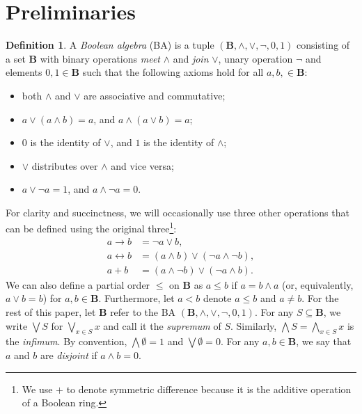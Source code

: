 \documentclass{article}
\theoremstyle{definition}
\newtheorem{definition}{Definition}
\theoremstyle{remark}
\begin{document}
\section{Preliminaries}


\begin{definition} \label{def:ba}
  A \emph{Boolean algebra} (BA) is a tuple $(\mathbf{B}, \land, \lor, \neg, 0,
  1)$ consisting of a set $\mathbf{B}$ with binary operations \emph{meet}
  $\land$ and \emph{join} $\lor$, unary operation $\neg$ and elements $0, 1 \in
  \mathbf{B}$ such that the following axioms hold for all $a, b, \in
  \mathbf{B}$:
  \begin{itemize}
  \item both $\land$ and $\lor$ are associative and commutative;
  \item $a \lor (a \land b) = a$, and $a \land (a \lor b) = a$;
  \item $0$ is the identity of $\lor$, and $1$ is the identity of $\land$;
  \item $\lor$ distributes over $\land$ and vice versa;
  \item $a \lor \neg a = 1$, and $a \land \neg a = 0$.
  \end{itemize}
\end{definition}

For clarity and succinctness, we will occasionally use three other operations
that can be defined using the original three\footnote{We use $+$ to denote
  symmetric difference because it is the additive operation of a Boolean ring.}:
\begin{align*}
  a \to b &= \neg a \lor b, \\
  a \leftrightarrow b &= (a \land b) \lor (\neg a \land \neg b), \\
  a + b &= (a \land \neg b) \lor (\neg a \land b).
\end{align*}
We can also define a partial order $\le$ on $\mathbf{B}$ as $a \le b$ if $a = b
\land a$ (or, equivalently, $a \lor b = b$) for $a, b \in \mathbf{B}$.
Furthermore, let $a < b$ denote $a \le b$ and $a \ne b$. For the rest of this
paper, let $\mathbf{B}$ refer to the BA $(\mathbf{B}, \land, \lor, \neg, 0, 1)$.
For any $S \subseteq \mathbf{B}$, we write $\bigvee S$ for $\bigvee_{x \in S} x$
and call it the \emph{supremum} of $S$. Similarly, $\bigwedge S = \bigwedge_{x
  \in S} x$ is the \emph{infimum}. By convention, $\bigwedge \emptyset = 1$ and
$\bigvee \emptyset = 0$. For any $a, b \in \mathbf{B}$, we say that $a$ and $b$
are \emph{disjoint} if $a \land b = 0$.
\end{document}
